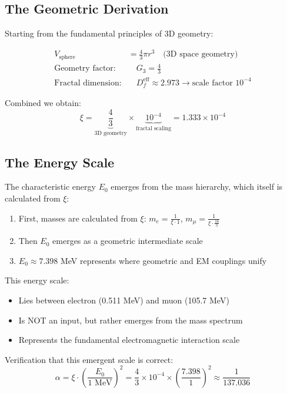 	\subsection{The Geometric Derivation}
	
	Starting from the fundamental principles of 3D geometry:
	
	\begin{align}
		V_{\text{sphere}} &= \frac{4}{3}\pi r^3 \quad \text{(3D space geometry)}\\
		\text{Geometry factor:} & \quad G_3 = \frac{4}{3}\\
		\text{Fractal dimension:} & \quad D_f^{\text{eff}} \approx 2.973 \rightarrow \text{scale factor } 10^{-4}
	\end{align}
	
	Combined we obtain:
	\begin{equation}
		\xi = \underbrace{\frac{4}{3}}_{\text{3D geometry}} \times \underbrace{10^{-4}}_{\text{fractal scaling}} = 1.333 \times 10^{-4}
	\end{equation}
	
	\subsection{The Energy Scale}
	
	The characteristic energy $E_0$ emerges from the mass hierarchy, which itself is calculated from $\xi$:
	
	\begin{enumerate}
		\item First, masses are calculated from $\xi$: $m_e = \frac{1}{\xi \cdot 1}$, $m_\mu = \frac{1}{\xi \cdot \frac{16}{5}}$
		\item Then $E_0$ emerges as a geometric intermediate scale
		\item $E_0 \approx 7.398$ MeV represents where geometric and EM couplings unify
	\end{enumerate}
	
	This energy scale:
	\begin{itemize}
		\item Lies between electron (0.511 MeV) and muon (105.7 MeV)
		\item Is NOT an input, but rather emerges from the mass spectrum
		\item Represents the fundamental electromagnetic interaction scale
	\end{itemize}
	
	Verification that this emergent scale is correct:
	\begin{equation}
		\alpha = \xi \cdot \left(\frac{E_0}{1 \text{ MeV}}\right)^2 = \frac{4}{3} \times 10^{-4} \times \left(\frac{7.398}{1}\right)^2 \approx \frac{1}{137.036}
	\end{equation}
	
